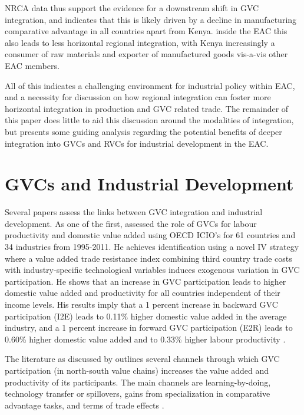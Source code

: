 \documentclass[a4paper]{article}
\begin{document}

NRCA data thus support the evidence for a downstream shift in GVC integration, and indicates that this is likely driven by a decline in manufacturing comparative advantage in all countries apart from Kenya. inside the EAC this also leads to less horizontal regional integration, with Kenya increasingly a consumer of raw materials and exporter of manufactured goods vis-a-vis other EAC members. \newline

All of this indicates a challenging environment for industrial policy within EAC, and a necessity for discussion on how regional integration can foster more horizontal integration in production and GVC related trade. The remainder of this paper does little to aid this discussion around the modalities of integration, but presents some guiding analysis regarding the potential benefits of deeper integration into GVCs and RVCs for industrial development in the EAC. 





\section{GVCs and Industrial Development}
Several papers assess the links between GVC integration and industrial development. As one of the first, \citet{Kummritz20161} assessed the role of GVCs for labour productivity and domestic value added using OECD ICIO's for 61 countries and 34 industries from 1995-2011. He achieves identification using a novel IV strategy where a value added trade resistance index combining third country trade costs with industry-specific technological variables induces exogenous variation in GVC participation. He shows that an increase in GVC participation leads to higher domestic value added and productivity for all countries independent of their income levels. His results imply that a 1 percent increase in backward GVC participation (I2E) leads to 0.11\% higher domestic value added in the average industry, and  a 1 percent increase in forward GVC participation (E2R) leads to 0.60\% higher domestic value added and to 0.33\% higher labour productivity \citep{Kummritz20161}. \newline


The literature as discussed by \citet{Kummritz20161} outlines several channels through which GVC participation (in north-south value chains) increases the value added and productivity of its participants. The main channels are learning-by-doing, technology transfer or spillovers, gains from specialization in comparative advantage tasks, and terms of trade effects  \citep{Kummritz20161}. \newline
\end{document}
